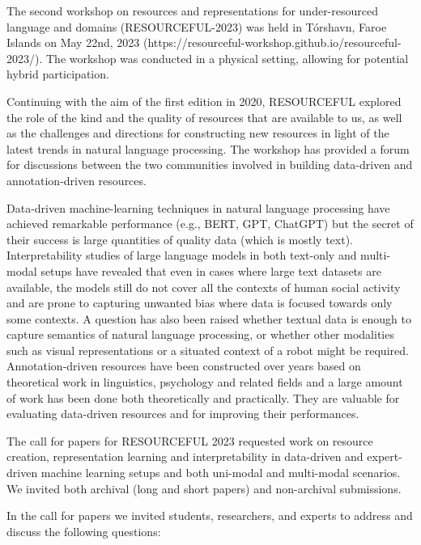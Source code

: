 The second workshop on resources and representations for under-resourced language and domains (RESOURCEFUL-2023) was held in Tórshavn, Faroe Islands on May 22nd, 2023 (https://resourceful-workshop.github.io/resourceful-2023/). The workshop was conducted in a physical setting, allowing for potential hybrid participation.

Continuing with the aim of the first edition in 2020, RESOURCEFUL explored the role of the kind and the quality of resources that are available to us, as well as the challenges and directions for constructing new resources in light of the latest trends in natural language processing. The workshop has provided a forum for discussions between the two communities involved in building data-driven and annotation-driven resources.

Data-driven machine-learning techniques in natural language processing have achieved remarkable performance (e.g., BERT, GPT, ChatGPT) but the secret of their success is large quantities of quality data (which is mostly text). Interpretability studies of large language models in both text-only and multi-modal setups have revealed that even in cases where large text datasets are available, the models still do not cover all the contexts of human social activity and are prone to capturing unwanted bias where data is focused towards only some contexts. A question has also been raised whether textual data is enough to capture semantics of natural language processing, or whether other modalities such as visual representations or a situated context of a robot might be required. Annotation-driven resources have been constructed over years based on theoretical work in linguistics, psychology and related fields and a large amount of work has been done both theoretically and practically. They are valuable for evaluating data-driven resources and for improving their performances. 

The call for papers for RESOURCEFUL 2023 requested work on resource creation, representation learning and interpretability in data-driven and expert-driven machine learning setups and both uni-modal and multi-modal scenarios. We invited both archival (long and short papers) and non-archival submissions. 

In the call for papers we invited students, researchers, and experts to address and discuss the following questions:

